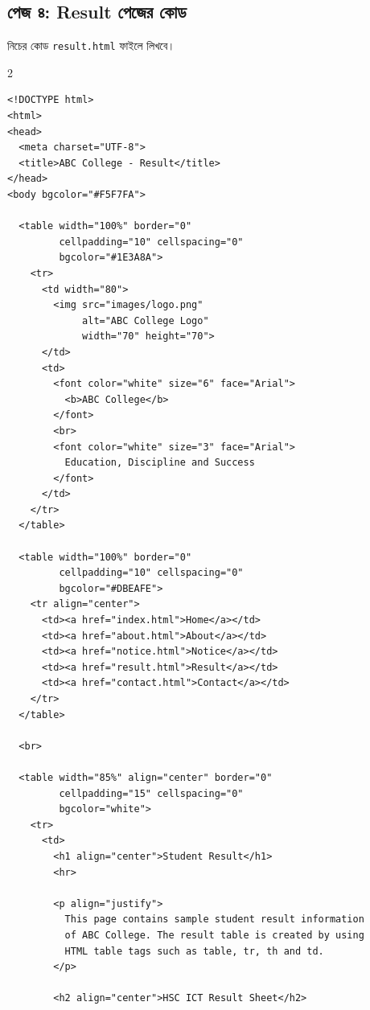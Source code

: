 \subsection{পেজ ৪: Result পেজের কোড}

নিচের কোড \texttt{result.html} ফাইলে লিখবে।

\par{}\par
\begin{multicols}{2}
\begin{verbatim}
<!DOCTYPE html>
<html>
<head>
  <meta charset="UTF-8">
  <title>ABC College - Result</title>
</head>
<body bgcolor="#F5F7FA">

  <table width="100%" border="0"
         cellpadding="10" cellspacing="0"
         bgcolor="#1E3A8A">
    <tr>
      <td width="80">
        <img src="images/logo.png"
             alt="ABC College Logo"
             width="70" height="70">
      </td>
      <td>
        <font color="white" size="6" face="Arial">
          <b>ABC College</b>
        </font>
        <br>
        <font color="white" size="3" face="Arial">
          Education, Discipline and Success
        </font>
      </td>
    </tr>
  </table>

  <table width="100%" border="0"
         cellpadding="10" cellspacing="0"
         bgcolor="#DBEAFE">
    <tr align="center">
      <td><a href="index.html">Home</a></td>
      <td><a href="about.html">About</a></td>
      <td><a href="notice.html">Notice</a></td>
      <td><a href="result.html">Result</a></td>
      <td><a href="contact.html">Contact</a></td>
    </tr>
  </table>

  <br>

  <table width="85%" align="center" border="0"
         cellpadding="15" cellspacing="0"
         bgcolor="white">
    <tr>
      <td>
        <h1 align="center">Student Result</h1>
        <hr>

        <p align="justify">
          This page contains sample student result information
          of ABC College. The result table is created by using
          HTML table tags such as table, tr, th and td.
        </p>

        <h2 align="center">HSC ICT Result Sheet</h2>


\end{verbatim}
\end{multicols}
